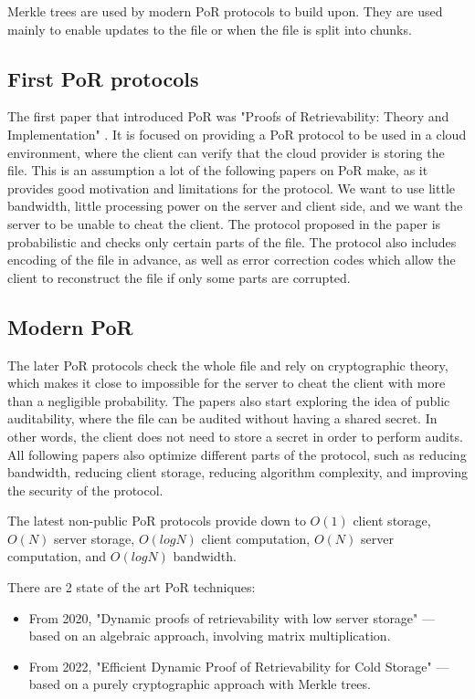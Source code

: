 Merkle trees are used by modern PoR protocols \cite{pormerkle} to build upon.
They are used mainly to enable updates to the file or when the file is split into chunks.

\subsection{First PoR protocols}

The first paper that introduced PoR was "Proofs of Retrievability: Theory and Implementation" \cite{porfirst}.
It is focused on providing a PoR protocol to be used in a cloud environment,
where the client can verify that the cloud provider is storing the file.
This is an assumption a lot of the following papers on PoR make,
as it provides good motivation and limitations for the protocol.
We want to use little bandwidth, little processing power on the server and client side,
and we want the server to be unable to cheat the client.
The protocol proposed in the paper is probabilistic and checks only certain parts of the file.
The protocol also includes encoding of the file in advance, as well as error correction codes
which allow the client to reconstruct the file if only some parts are corrupted.

\subsection{Modern PoR}

The later PoR protocols check the whole file and rely on cryptographic theory,
which makes it close to impossible for the server to cheat the client with more than a negligible probability.
The papers \cite{pormerkle, poralgebra} also start exploring the idea of public auditability,
where the file can be audited without having a shared secret.
In other words, the client does not need to store a secret in order to perform audits.
All following papers also optimize different parts of the protocol, such as reducing bandwidth,
reducing client storage, reducing algorithm complexity, and improving the security of the protocol.

The latest non-public PoR protocols provide down to $O(1)$ client storage, $O(N)$ server storage,
$O(log N)$ client computation, $O(N)$ server computation, and $O(log N)$ bandwidth.

There are 2 state of the art PoR techniques:
\begin{itemize}
    \item From 2020, "Dynamic proofs of retrievability with low server storage" \cite{poralgebra} —
        based on an algebraic approach, involving matrix multiplication.
    \item From 2022, "Efficient Dynamic Proof of Retrievability for Cold Storage" \cite{pormerkle} —
        based on a purely cryptographic approach with Merkle trees.
\end{itemize}

